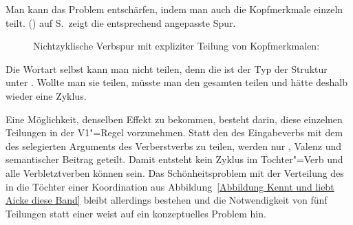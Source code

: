 Man kann das Problem entschärfen, indem man auch die Kopfmerkmale einzeln teilt. () auf
S.\,\pageref{le-Verbspur-nicht-zyklisch-mit-VFORM-Teilung} zeigt die entsprechend angepasste Spur.
\begin{figure}
\ea
\label{le-Verbspur-nicht-zyklisch-mit-VFORM-Teilung}%
Nichtzyklische Verbspur mit expliziter Teilung von Kopfmerkmalen:\\
\z
\vspace{-2\baselineskip}
\end{figure}
Die Wortart selbst kann man nicht teilen, denn die ist der Typ der Struktur unter \head. Wollte man
sie teilen, müsste man den gesamten \headw teilen und hätte deshalb wieder eine Zyklus. 

Eine Möglichkeit, denselben Effekt zu bekommen, besteht darin, diese einzelnen Teilungen in der V1"=Regel
vorzunehmen. Statt den \localw des Eingabeverbs  mit dem \dslw des selegierten Arguments des
Verberstverbs zu teilen, werden nur \vform, Valenz und semantischer Beitrag geteilt. Damit entsteht
kein Zyklus im Tochter"=Verb und alle Verbletztverben können \dsl {} sein. Das Schönheitsproblem mit
der Verteilung des \dslwes in die Töchter einer Koordination aus Abbildung~\ref{Abbildung Kennt und
  liebt Aicke diese Band} bleibt allerdings bestehen und die Notwendigkeit von fünf Teilungen statt
einer weist auf ein konzeptuelles Problem hin.

